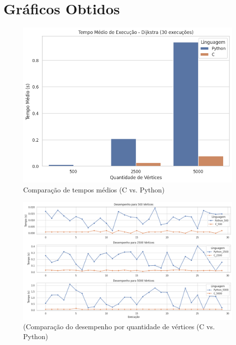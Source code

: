 \documentclass[12pt,a4paper]{report}
\begin{document}
\section*{Gráficos Obtidos}
\begin{figure}[H]
    \centering
    \includegraphics[width=1\textwidth]{tempo_medio.png}
    \caption{Comparação de tempos médios (C vs. Python)}
\end{figure}

\begin{figure}[H]
    \centering
    \includegraphics[width=1\textwidth]{desempenho.png}
    \caption{(Comparação do desempenho por quantidade de vértices (C vs. Python)}
\end{figure}
\end{document}
